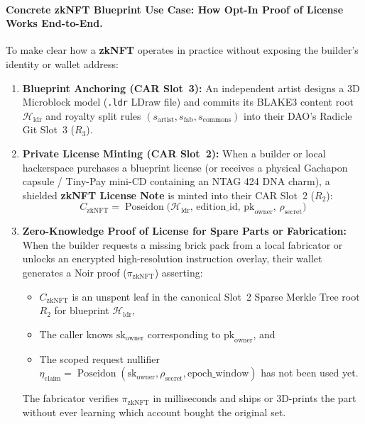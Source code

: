 \documentclass[a4paper,11pt,twoside,parskip=half-,headings=small]{scrartcl}
\newcommand{\code}[1]{\texttt{#1}}
\begin{document}
\paragraph{Concrete zkNFT Blueprint Use Case: How Opt-In Proof of License Works End-to-End.}
To make clear how a \textbf{zkNFT} operates in practice without exposing the builder's identity or wallet address:
\begin{enumerate}[nosep]
  \item \textbf{Blueprint Anchoring (CAR Slot~3):} An independent artist designs a 3D Microblock model (\code{.ldr} LDraw file) and commits its BLAKE3 content root $\mathcal{H}_{\text{ldr}}$ and royalty split rules $(s_{\text{artist}}, s_{\text{fab}}, s_{\text{commons}})$ into their DAO's Radicle Git Slot~3 ($R_3$).
  \item \textbf{Private License Minting (CAR Slot~2):} When a builder or local hackerspace purchases a blueprint license (or receives a physical Gachapon capsule / Tiny-Pay mini-CD containing an NTAG 424 DNA charm), a shielded \textbf{zkNFT License Note} is minted into their CAR Slot~2 ($R_2$):
  \begin{equation}
    C_{\text{zkNFT}} = \operatorname{Poseidon}\bigl(\mathcal{H}_{\text{ldr}},\, \text{edition\_id},\, \text{pk}_{\text{owner}},\, \rho_{\text{secret}}\bigr)
  \end{equation}
  \item \textbf{Zero-Knowledge Proof of License for Spare Parts or Fabrication:} When the builder requests a missing brick pack from a local fabricator or unlocks an encrypted high-resolution instruction overlay, their wallet generates a Noir proof ($\pi_{\text{zkNFT}}$) asserting:
  \begin{itemize}[nosep]
    \item $C_{\text{zkNFT}}$ is an unspent leaf in the canonical Slot~2 Sparse Merkle Tree root $R_2$ for blueprint $\mathcal{H}_{\text{ldr}}$,
    \item The caller knows $\text{sk}_{\text{owner}}$ corresponding to $\text{pk}_{\text{owner}}$, and
    \item The scoped request nullifier $\eta_{\text{claim}} = \operatorname{Poseidon}(\text{sk}_{\text{owner}}, \rho_{\text{secret}}, \text{epoch\_window})$ has not been used yet.
  \end{itemize}
  The fabricator verifies $\pi_{\text{zkNFT}}$ in milliseconds and ships or 3D-prints the part without ever learning which account bought the original set.
\end{enumerate}
\end{document}
